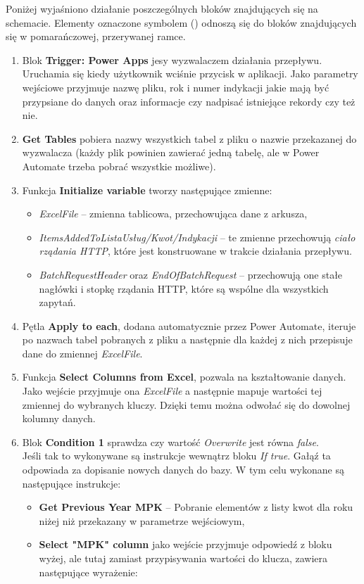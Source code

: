 Poniżej wyjaśniono działanie poszczególnych bloków znajdujących się na schemacie. Elementy oznaczone symbolem (\textasteriskcentered) odnoszą się do bloków znajdujących się w pomarańczowej, przerywanej ramce.
\begin{enumerate}
    \item Blok \textbf{Trigger: Power Apps} jesy wyzwalaczem działania przepływu. Uruchamia się kiedy użytkownik wciśnie przycisk w aplikacji. Jako parametry wejściowe przyjmuje nazwę pliku, rok i numer indykacji jakie mają być przypsiane do danych oraz informacje czy nadpisać istniejące rekordy czy też nie.
    
    \item \textbf{Get Tables} pobiera nazwy wszystkich tabel z pliku o nazwie przekazanej do wyzwalacza (każdy plik powinien zawierać jedną tabelę, ale w Power Automate trzeba pobrać wszystkie możliwe).
    \item Funkcja \textbf{Initialize variable} tworzy następujące zmienne:
    \begin{itemize}
    \item \emph{ExcelFile} -- zmienna tablicowa, przechowująca dane z arkusza,
    \item \emph{ItemsAddedToListaUsług/Kwot/Indykacji} -- te zmienne przechowują \emph{ciało rządania HTTP}, które jest konstruowane w trakcie działania przepływu.
    \item \emph{BatchRequestHeader} oraz \emph{EndOfBatchRequest} -- przechowują one stałe nagłówki i stopkę rządania HTTP, które są wspólne dla wszystkich zapytań.
    \end{itemize}
    \item Pętla \textbf{Apply to each}, dodana automatycznie przez Power Automate, iteruje po nazwach tabel pobranych z pliku a następnie dla każdej z nich przepisuje dane do zmiennej \emph{ExcelFile}. 
    \item Funkcja \textbf{Select Columns from Excel}, pozwala na kształtowanie danych. Jako wejście przyjmuje ona \emph{ExcelFile} a następnie mapuje wartości tej zmiennej do wybranych kluczy. Dzięki temu można odwołać się do dowolnej kolumny danych.
    \item Blok \textbf{Condition 1} sprawdza czy wartość \emph{Overwrite} jest równa \emph{false}. \\
    Jeśli tak to wykonywane są instrukcje wewnątrz bloku \emph{If true}. Gałąź ta odpowiada za dopisanie nowych danych do bazy. W tym celu wykonane są następujące instrukcje:
    \begin{itemize}[label=\textasteriskcentered]
        \item \textbf{Get Previous Year MPK} -- Pobranie elementów z listy kwot dla roku niżej niż przekazany w parametrze wejściowym,
        \item \textbf{Select "MPK" column} jako wejście przyjmuje odpowiedź z bloku wyżej, ale tutaj zamiast przypisywania wartości do klucza, zawiera następujące wyrażenie:
        

\end{itemize}
\end{enumerate}
